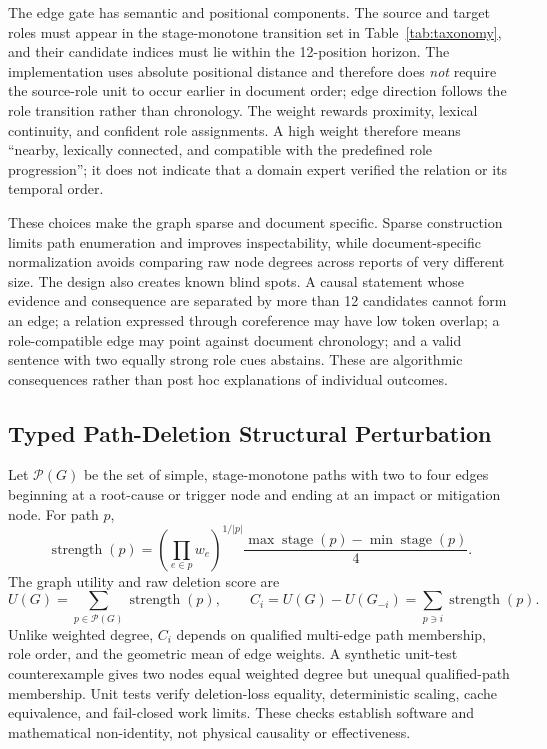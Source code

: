 \documentclass[applsci,article,submit,moreauthors]{Definitions/mdpi}
\begin{document}
The edge gate has semantic and positional components. The source and target roles must appear in the stage-monotone transition set in Table~\ref{tab:taxonomy}, and their candidate indices must lie within the 12-position horizon. The implementation uses absolute positional distance and therefore does \emph{not} require the source-role unit to occur earlier in document order; edge direction follows the role transition rather than chronology. The weight rewards proximity, lexical continuity, and confident role assignments. A high weight therefore means ``nearby, lexically connected, and compatible with the predefined role progression''; it does not indicate that a domain expert verified the relation or its temporal order.

These choices make the graph sparse and document specific. Sparse construction limits path enumeration and improves inspectability, while document-specific normalization avoids comparing raw node degrees across reports of very different size. The design also creates known blind spots. A causal statement whose evidence and consequence are separated by more than 12 candidates cannot form an edge; a relation expressed through coreference may have low token overlap; a role-compatible edge may point against document chronology; and a valid sentence with two equally strong role cues abstains. These are algorithmic consequences rather than post hoc explanations of individual outcomes.

\subsection{Typed Path-Deletion Structural Perturbation}

Let $\mathcal{P}(G)$ be the set of simple, stage-monotone paths with two to four edges beginning at a root-cause or trigger node and ending at an impact or mitigation node. For path $p$,
\begin{equation}
\operatorname{strength}(p)=\left(\prod_{e\in p}w_e\right)^{1/|p|}\frac{\max\operatorname{stage}(p)-\min\operatorname{stage}(p)}{4}.
\end{equation}
The graph utility and raw deletion score are
\begin{equation}
U(G)=\sum_{p\in\mathcal{P}(G)}\operatorname{strength}(p),\qquad
C_i=U(G)-U(G_{-i})=\sum_{p\ni i}\operatorname{strength}(p).
\end{equation}
Unlike weighted degree, $C_i$ depends on qualified multi-edge path membership, role order, and the geometric mean of edge weights. A synthetic unit-test counterexample gives two nodes equal weighted degree but unequal qualified-path membership. Unit tests verify deletion-loss equality, deterministic scaling, cache equivalence, and fail-closed work limits. These checks establish software and mathematical non-identity, not physical causality or effectiveness.
\end{document}
